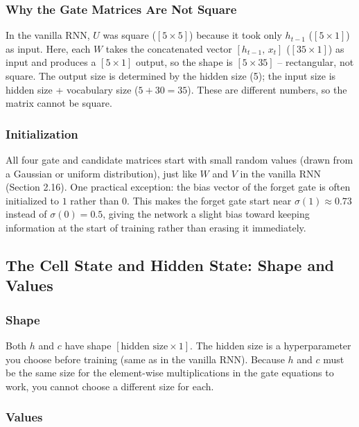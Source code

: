 \documentclass[12pt,a4paper]{article}
\begin{document}
\subsubsection{Why the Gate Matrices Are Not Square}

In the vanilla RNN, $U$ was square ($[5 \times 5]$) because it took only $h_{t-1}$
($[5 \times 1]$) as input. Here, each $W$ takes the concatenated vector
$[h_{t-1},\, x_t]$ ($[35 \times 1]$) as input and produces a $[5 \times 1]$ output,
so the shape is $[5 \times 35]$ -- rectangular, not square. The output size is
determined by the hidden size (5); the input size is hidden size + vocabulary size
($5 + 30 = 35$). These are different numbers, so the matrix cannot be square.

\subsubsection{Initialization}

All four gate and candidate matrices start with small random values (drawn from a
Gaussian or uniform distribution), just like $W$ and $V$ in the vanilla RNN
(Section 2.16). One practical exception: the bias vector of the forget gate is often
initialized to $1$ rather than $0$. This makes the forget gate start near $\sigma(1)
\approx 0.73$ instead of $\sigma(0) = 0.5$, giving the network a slight bias toward
keeping information at the start of training rather than erasing it immediately.

\subsection{The Cell State and Hidden State: Shape and Values}

\subsubsection{Shape}

Both $h$ and $c$ have shape $[\text{hidden size} \times 1]$. The hidden size is a
hyperparameter you choose before training (same as in the vanilla RNN). Because $h$
and $c$ must be the same size for the element-wise multiplications in the gate
equations to work, you cannot choose a different size for each.

\subsubsection{Values}
\end{document}
